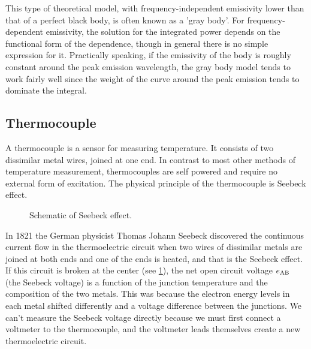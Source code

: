 This type of theoretical model, with frequency-independent emissivity lower than that of a perfect black body, is often known as a 'gray body'. For frequency-dependent emissivity, the solution for the integrated power depends on the functional form of the dependence, though in general there is no simple expression for it. Practically speaking, if the emissivity of the body is roughly constant around the peak emission wavelength, the gray body model tends to work fairly well since the weight of the curve around the peak emission tends to dominate the integral.

\subsection{Thermocouple}
\noindent
A thermocouple is a sensor for measuring temperature.
It consists of two dissimilar metal wires, joined at one end.
In contrast to most other methods of temperature measurement, thermocouples are self powered and require no external form of excitation.
The physical principle of the thermocouple is Seebeck effect.

\begin{figure}[!htp]
\centering{}
\caption{Schematic of Seebeck effect.}
\label{Fig:Seebeck_Voltage}
\end{figure}
In 1821 the German physicist Thomas Johann Seebeck discovered the continuous current flow in the thermoelectric circuit when two wires of dissimilar metals are joined at both ends and one of the ends is heated, and that is the Seebeck effect.
If this circuit is broken at the center (see \ref{Fig:Seebeck_Voltage}), the net open circuit voltage $e_{\rm AB}$ (the Seebeck voltage) is a function of the junction temperature and the composition of the two metals.
This was because the electron energy levels in each metal shifted differently and a voltage difference between the junctions.
We can't measure the Seebeck voltage directly because we must first connect a voltmeter to the thermocouple, and the voltmeter leads themselves create a new thermoelectric circuit.

